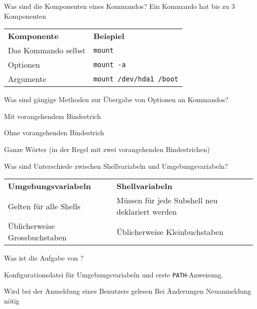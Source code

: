 \renewcommand{\sect}{103 GNU- und Unix-Kommandos}

\cardfrontfoot{\chap/\sect}

\begin{flashcard}[Information]{Was sind die Komponenten eines Kommandos?}
	Ein Kommando hat bis zu 3 Komponenten
	
	\begin{tabular}{ll}
		\textbf{Komponente}	& \textbf{Beispiel}\\
		Das Kommando selbst & \texttt{mount}\\
		Optionen 			& \texttt{mount -a}\\
		Argumente			& \texttt{mount /dev/hda1 /boot}
	\end{tabular}
	
\end{flashcard}

\begin{flashcard}[Information]{Was sind gängige Methoden zur Übergabe von Optionen an Kommandos?}
	\begin{description}
		\item Mit vorangehendem Bindestrich
		
		\item Ohne vorangehenden Bindestrich
		
		\item Ganze Wörter (in der Regel mit zwei vorangehenden Bindestrichen)
	\end{description}
\end{flashcard}

\begin{flashcard}[Information]{Was sind Unterschiede zwischen Shellvariabeln und Umgebungsvariabeln?}
	\begin{tabular}{ll}
		\textbf{Umgebungsvariabeln} & \textbf{Shellvariabeln}\\
		Gelten für alle Shells  & Müssen für jede Subshell neu deklariert werden\\
		Üblicherweise Grossbuchstaben	& Üblicherweise Kleinbuchstaben
	\end{tabular}
\end{flashcard}

\begin{flashcard}[File]{Was ist die Aufgabe von ?}
	\begin{description}
		\item Konfigurationsdatei für Umgebungsvariabeln und erste \texttt{PATH}-Anweisung.
		
		\item Wird bei der Anmeldung eines Benutzers gelesen \textrightarrow Bei Änderungen Neuanmeldung nötig
	\end{description}
\end{flashcard}

